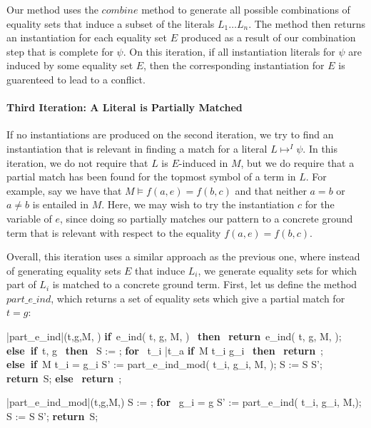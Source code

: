 \documentclass{llncs}
\def\IF{\qtab\keyword{if}\ }
\def\THEN{\ \keyword{then}\ }
\def\ELSE{\untab\qtab\keyword{else}\ }
\def\ELSEIF{\untab\qtab\keyword{else if}\ }
\def\FI{\untab}
\def\RETURN{\keyword{return}\ }
\def\ENDPROC{\untab}
\def\DOFOR{\qtab\keyword{for}\ }
\def\ENDFOR{\untab}
\def\keyword#1{\mbox{\normalshape\bf #1}}
\begin{document}
Our method uses the $combine$ method to generate all possible combinations of equality sets that induce a subset of the literals $L_1 \ldots L_n$.
The method then returns an instantiation for each equality set $E$ produced as a result of our combination step that is complete for $\psi$.
On this iteration, if all instantiation literals for $\psi$ are induced by some equality set $E$, then the corresponding instantiation for $E$ is guarenteed to lead to a conflict.

\paragraph{Third Iteration: A Literal is Partially Matched}

If no instantiations are produced on the second iteration, we try to find an instantiation that is relevant in finding a match for a literal $L \mapsto^I \psi$.
In this iteration, we do not require that $L$ is $E$-induced in $M$, but we do require that a partial match has been found for the topmost symbol of a term in $L$.
For example, say we have that $M \models f( a, e ) = f( b, c )$ and that neither $a = b$ or $a \neq b$ is entailed in $M$.  
Here, we may wish to try the instantiation $c$ for the variable of $e$, since doing so partially matches our pattern to a concrete ground term that is relevant with respect to the equality $f( a, e ) = f( b, c )$.

Overall, this iteration uses a similar approach as the previous one, where instead of generating equality sets $E$ that induce $L_i$, we generate equality sets for which part of $L_i$ is matched to a concrete ground term.
First, let us define the method $part\_e\_ind$, which returns a set of equality sets which give a partial match for $t = g$:

\begin{minipage}[t]{.4\linewidth}
\begin{program}
\PROC |part\_e\_ind|(t,g,M, \psi) \BODY
\IF e\_ind( t, g, M, \psi ) \neq \emptyset \THEN
  \RETURN e\_ind( t, g, M, \psi );
\ELSEIF t, g  \THEN
  S := \emptyset;
  \DOFOR {} t_i  \bar{t_a} 
    \IF M \models t_i \neq g_i \THEN
      \RETURN \emptyset;
    \ELSEIF M \not\models t_i = g_i
      S' := part\_e\_ind\_mod( t_i, g_i, M, \psi );
      S := S \cup S';
    \FI
  \ENDFOR
  \RETURN S;
\ELSE
  \RETURN \emptyset;
\FI
\ENDPROC
\end{program}
\end{minipage}
\begin{minipage}[t]{.4\linewidth}
\begin{program}
\PROC |part\_e\_ind\_mod|(t,g,M,\psi) \BODY
  S := \emptyset;
  \DOFOR {} g_i = g
    S' := part\_e\_ind( t_i, g_i, M,\psi );
    S := S \cup S';
  \ENDFOR
  \RETURN S;
\ENDPROC
\end{program}
\end{minipage}
\end{document}
